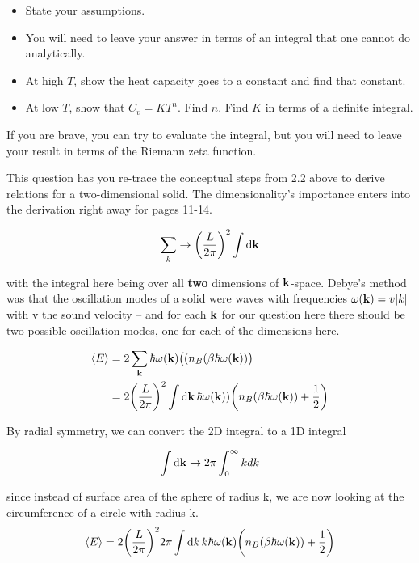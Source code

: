 \begin{itemize}
    \item State your assumptions.
    
    \item You will need to leave your answer in terms of an integral that one cannot do analytically.
    
    \item At high $T$, show the heat capacity goes to a constant and find that constant.
    
    \item At low $T$, show that $C_v = K T^n$. Find $n$. Find $K$ in terms of a definite integral.
\end{itemize}

If you are brave, you can try to evaluate the integral, but you will need to leave your result in terms of the Riemann zeta function.

\divider

This question has you re-trace the conceptual steps from 2.2 above to derive relations for a two-dimensional solid. The dimensionality's importance enters into the derivation right away for pages 11-14. 

\[ \sum_k \rightarrow \paren*{\frac{L}{2\pi}}^2 \int \dd{\vb{k}}\]

with the integral here being over all \textbf{two} dimensions of $\vb{k}$-space. Debye's method was that the oscillation modes of a solid were waves with frequencies $\omega(\vb{k}) = v\abs{k}$ with v the sound velocity -- and for each $\vb{k}$ for our question here there should be two possible oscillation modes, one for each of the dimensions here. 

\begin{align}
    \avg{E} &= 2 \sum_{\vb{k}} \hbar \omega (\vb{k}) \paren*{(n_B(\beta \hbar \omega(\vb{k}))} \\
            &= 2 \paren*{\frac{L}{2\pi}}^2 \int \dd{\vb{k}} \hbar \omega (\vb{k})) \paren*{n_B ( \beta \hbar \omega(\vb{k})) + \frac{1}{2}}
\end{align}

By radial symmetry, we can convert the 2D integral to a 1D integral

\[ \int \dd{\vb{k}} \rightarrow 2 \pi \int_0^{\infty} k dk\]

since instead of surface area of the sphere of radius k, we are now looking at the circumference of a circle with radius k.
\[ \avg{E} = 2 \paren*{\frac{L}{2\pi}}^2 2 \pi \int \dd{k} k \hbar \omega (\vb{k}) \paren*{n_B ( \beta \hbar \omega(\vb{k})) + \frac{1}{2}}\]

